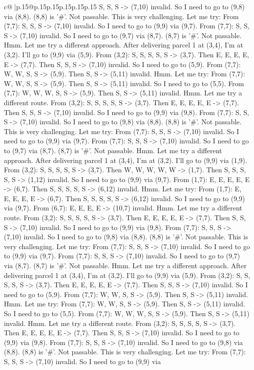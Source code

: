 \documentclass{article}
\begin{document}
{\begin{supertabular}{c@{$\;$}|p{.15\linewidth}@{}p{.15\linewidth}p{.15\linewidth}p{.15\linewidth}p{.15\linewidth}p{.15\linewidth}}
{{{S, S, S {-}> (7,10) invalid. So I need to go to (9,8) via (8,8). (8,8) is '\#'. Not passable. This is very challenging. Let me try: From (7,7): S, S, S {-}> (7,10) invalid. So I need to go to (9,9) via (9,7). From (7,7): S, S, S {-}> (7,10) invalid. So I need to go to (9,7) via (8,7). (8,7) is '\#'. Not passable. Hmm. Let me try a different approach. After delivering parcel 1 at (3,4), I'm at (3,2). I'll go to (9,9) via (5,9). From (3,2): S, S, S, S, S {-}> (3,7). Then E, E, E, E, E {-}> (7,7). Then S, S, S {-}> (7,10) invalid. So I need to go to (5,9). From (7,7): W, W, S, S {-}> (5,9). Then S, S {-}> (5,11) invalid. Hmm. Let me try: From (7,7): W, W, S, S {-}> (5,9). Then S, S {-}> (5,11) invalid. So I need to go to (5,5). From (7,7): W, W, W, S, S {-}> (5,9). Then S, S {-}> (5,11) invalid. Hmm. Let me try a different route. From (3,2): S, S, S, S, S {-}> (3,7). Then E, E, E, E, E {-}> (7,7). Then S, S, S {-}> (7,10) invalid. So I need to go to (9,9) via (9,8). From (7,7): S, S, S {-}> (7,10) invalid. So I need to go to (9,8) via (8,8). (8,8) is '\#'. Not passable. This is very challenging. Let me try: From (7,7): S, S, S {-}> (7,10) invalid. So I need to go to (9,9) via (9,7). From (7,7): S, S, S {-}> (7,10) invalid. So I need to go to (9,7) via (8,7). (8,7) is '\#'. Not passable. Hmm. Let me try a different approach. After delivering parcel 1 at (3,4), I'm at (3,2). I'll go to (9,9) via (1,9). From (3,2): S, S, S, S, S {-}> (3,7). Then W, W, W, W, W {-}> (1,7). Then S, S, S, S, S {-}> (1,12) invalid. So I need to go to (9,9) via (9,7). From (1,7): E, E, E, E, E {-}> (6,7). Then S, S, S, S, S {-}> (6,12) invalid. Hmm. Let me try: From (1,7): E, E, E, E, E {-}> (6,7). Then S, S, S, S, S {-}> (6,12) invalid. So I need to go to (9,9) via (9,7). From (6,7): E, E, E, E {-}> (10,7) invalid. Hmm. Let me try a different route. From (3,2): S, S, S, S, S {-}> (3,7). Then E, E, E, E, E {-}> (7,7). Then S, S, S {-}> (7,10) invalid. So I need to go to (9,9) via (9,8). From (7,7): S, S, S {-}> (7,10) invalid. So I need to go to (9,8) via (8,8). (8,8) is '\#'. Not passable. This is very challenging. Let me try: From (7,7): S, S, S {-}> (7,10) invalid. So I need to go to (9,9) via (9,7). From (7,7): S, S, S {-}> (7,10) invalid. So I need to go to (9,7) via (8,7). (8,7) is '\#'. Not passable. Hmm. Let me try a different approach. After delivering parcel 1 at (3,4), I'm at (3,2). I'll go to (9,9) via (5,9). From (3,2): S, S, S, S, S {-}> (3,7). Then E, E, E, E, E {-}> (7,7). Then S, S, S {-}> (7,10) invalid. So I need to go to (5,9). From (7,7): W, W, S, S {-}> (5,9). Then S, S {-}> (5,11) invalid. Hmm. Let me try: From (7,7): W, W, S, S {-}> (5,9). Then S, S {-}> (5,11) invalid. So I need to go to (5,5). From (7,7): W, W, W, S, S {-}> (5,9). Then S, S {-}> (5,11) invalid. Hmm. Let me try a different route. From (3,2): S, S, S, S, S {-}> (3,7). Then E, E, E, E, E {-}> (7,7). Then S, S, S {-}> (7,10) invalid. So I need to go to (9,9) via (9,8). From (7,7): S, S, S {-}> (7,10) invalid. So I need to go to (9,8) via (8,8). (8,8) is '\#'. Not passable. This is very challenging. Let me try: From (7,7): S, S, S {-}> (7,10) invalid. So I need to go to (9,9) via }}}
\end{supertabular}}
\end{document}
